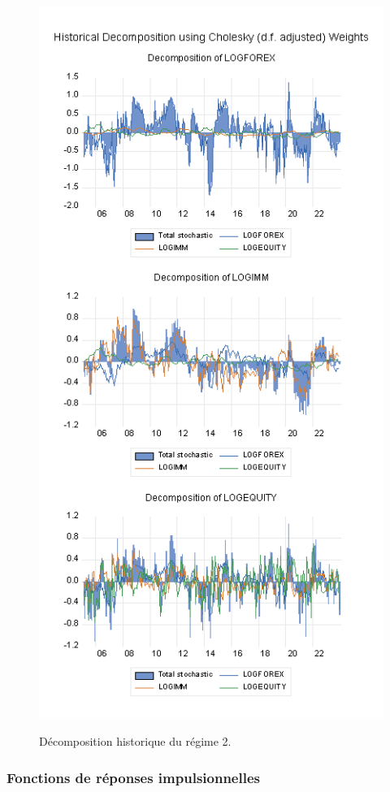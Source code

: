 \begin{figure}[H]
    \centering
    \caption{Décomposition historique du régime 2.}
    \includegraphics[scale=1]{annexes/regime_2_historical_decomposition.png}
    \label{fig:msih_resids}
\end{figure}

\subsubsection{Fonctions de réponses impulsionnelles}

